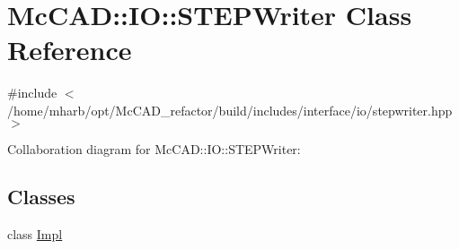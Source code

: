 \hypertarget{classMcCAD_1_1IO_1_1STEPWriter}{}\section{Mc\+C\+AD\+:\+:IO\+:\+:S\+T\+E\+P\+Writer Class Reference}
\label{classMcCAD_1_1IO_1_1STEPWriter}


{\ttfamily \#include $<$/home/mharb/opt/\+Mc\+C\+A\+D\+\_\+refactor/build/includes/interface/io/stepwriter.\+hpp$>$}



Collaboration diagram for Mc\+C\+AD\+:\+:IO\+:\+:S\+T\+E\+P\+Writer\+:
\subsection*{Classes}
\begin{DoxyCompactItemize}
\item 
class \hyperlink{classMcCAD_1_1IO_1_1STEPWriter_1_1Impl}{Impl}
\end{DoxyCompactItemize}
